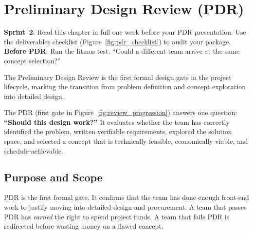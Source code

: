 \chapter{Preliminary Design Review (PDR)}\label{ch:pdr}

\begin{tipbox}
\textbf{Sprint~2}: Read this chapter in full one week before your PDR presentation. Use the deliverables checklist (Figure~\ref{fig:pdr_checklist}) to audit your package. \textbf{Before PDR}: Run the litmus test: ``Could a different team arrive at the same concept selection?''
\end{tipbox}


\vspace{1em}

The Preliminary Design Review is the first formal design gate in the project lifecycle, marking the transition from problem definition and concept exploration into detailed design.

The PDR (first gate in Figure~\ref{fig:review_progression}) answers one question: \textbf{``Should this design work?''} It evaluates whether the team has correctly identified the problem, written verifiable requirements, explored the solution space, and selected a concept that is technically feasible, economically viable, and schedule-achievable.

\vspace{1em}

\section{Purpose and Scope}
PDR is the first formal gate. It confirms that the team has done enough front-end work to justify moving into detailed design and procurement. A team that passes PDR has \emph{earned} the right to spend project funds. A team that fails PDR is redirected before wasting money on a flawed concept.

